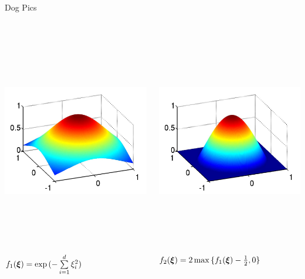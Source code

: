 \documentclass[final]{beamer}
\newcommand {\bxi} {\mbox{\boldmath $\xi$}}%
\begin{document}
\begin{frame}{}
{\begin{columns}[t]
\begin{column}{.30\linewidth}
\begin{block}{\centering Dog Pics} 
\vspace{-1em}
\begin{columns}[T]
\begin{column}{18cm}{}
\centering\includegraphics[height=10cm, width = 14cm]{figures/gaussian}\\
\centering\scriptsize{$f_1(\bxi) = \exp{(-\sum\limits_{i=1}^d \xi_i^2)}$}
\end{column}
\begin{column}{18cm}{}
\centering\includegraphics[height=10cm, width = 14cm]{figures/maxgaussian}\\
\centering\scriptsize{$f_2(\bxi) = 2\max{\{f_1(\bxi)-\frac{1}{2},0\}}$}
\end{column}
\end{columns}


\end{block}
\end{column}
\end{columns}}
\end{frame}
\end{document}
